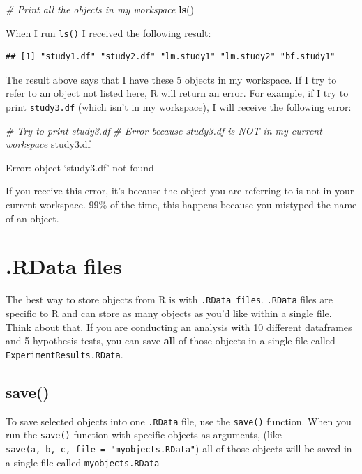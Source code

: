 \documentclass[]{book}
\newenvironment{Shaded}{\begin{snugshade}}{\end{snugshade}}
\newcommand{\KeywordTok}[1]{\textcolor[rgb]{0.13,0.29,0.53}{\textbf{{#1}}}}
\newcommand{\CommentTok}[1]{\textcolor[rgb]{0.56,0.35,0.01}{\textit{{#1}}}}
\newcommand{\NormalTok}[1]{{#1}}
\theoremstyle{definition}
\theoremstyle{definition}
\theoremstyle{remark}
\begin{document}
\begin{Shaded}
\begin{Highlighting}[]
\CommentTok{# Print all the objects in my workspace}
\KeywordTok{ls}\NormalTok{()}
\end{Highlighting}
\end{Shaded}

When I run \texttt{ls()} I received the following result:

\begin{verbatim}
## [1] "study1.df" "study2.df" "lm.study1" "lm.study2" "bf.study1"
\end{verbatim}

The result above says that I have these 5 objects in my workspace. If I
try to refer to an object not listed here, R will return an error. For
example, if I try to print \texttt{study3.df} (which isn't in my
workspace), I will receive the following error:

\begin{Shaded}
\begin{Highlighting}[]
\CommentTok{# Try to print study3.df}
\CommentTok{#  Error because study3.df is NOT in my current workspace}
\NormalTok{study3.df}
\end{Highlighting}
\end{Shaded}

Error: object `study3.df' not found

If you receive this error, it's because the object you are referring to
is not in your current workspace. 99\% of the time, this happens because
you mistyped the name of an object.

\section{.RData files}\label{rdata-files}

The best way to store objects from R is with \texttt{.RData\ files}.
\texttt{.RData} files are specific to R and can store as many objects as
you'd like within a single file. Think about that. If you are conducting
an analysis with 10 different dataframes and 5 hypothesis tests, you can
save \textbf{all} of those objects in a single file called
\texttt{ExperimentResults.RData}.

\subsection{save()}\label{save}

To save selected objects into one \texttt{.RData} file, use the
\texttt{save()} function. When you run the \texttt{save()} function with
specific objects as arguments, (like
\texttt{save(a,\ b,\ c,\ file\ =\ "myobjects.RData"}) all of those
objects will be saved in a single file called \texttt{myobjects.RData}
\end{document}
